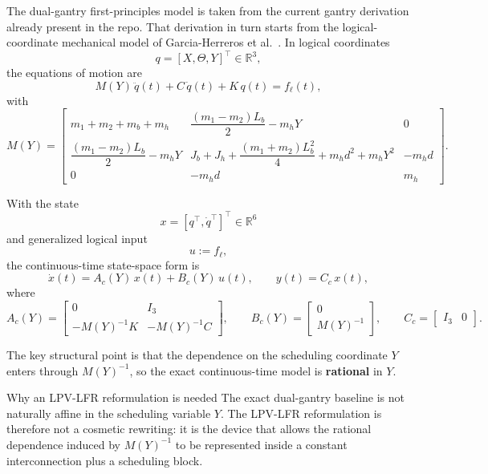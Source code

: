 \documentclass[11pt]{article}
\newcommand{\R}{\mathbb{R}}
\begin{document}
The dual-gantry first-principles model is taken from the current gantry
derivation already present in the repo. That derivation in turn starts from the
logical-coordinate mechanical model of Garcia-Herreros et al.~\cite{garcia2013model}. In logical
coordinates
\[
q = [X,\Theta,Y]^\top \in \R^3,
\]
the equations of motion are
\begin{equation}
    M(Y)\,\ddot{q}(t) + C\,\dot{q}(t) + K\,q(t) = f_\ell(t),
    \label{eqv:eom}
\end{equation}
with
\begin{equation}
    M(Y) =
    \begin{bmatrix}
        m_1 + m_2 + m_b + m_h &
        \dfrac{(m_1-m_2)L_b}{2} - m_h Y &
        0 \\
        \dfrac{(m_1-m_2)L_b}{2} - m_h Y &
        J_b + J_h + \dfrac{(m_1+m_2)L_b^2}{4} + m_h d^2 + m_h Y^2 &
        -m_h d \\
        0 & -m_h d & m_h
    \end{bmatrix}.
    \label{eqv:M}
\end{equation}

With the state
\[
x = [q^\top,\dot{q}^\top]^\top \in \R^6
\]
and generalized logical input
\[
u := f_\ell,
\]
the continuous-time state-space form is
\begin{equation}
    \dot{x}(t) = A_c(Y)\,x(t) + B_c(Y)\,u(t),
    \qquad
    y(t) = C_c\,x(t),
    \label{eqv:ctss}
\end{equation}
where
\begin{equation}
    A_c(Y) =
    \begin{bmatrix}
        0 & I_3 \\
        -M(Y)^{-1}K & -M(Y)^{-1}C
    \end{bmatrix},
    \qquad
    B_c(Y) =
    \begin{bmatrix}
        0 \\
        M(Y)^{-1}
    \end{bmatrix},
    \qquad
    C_c = \begin{bmatrix} I_3 & 0 \end{bmatrix}.
    \label{eqv:ctmats}
\end{equation}

The key structural point is that the dependence on the scheduling coordinate
$Y$ enters through $M(Y)^{-1}$, so the exact continuous-time model is
\textbf{rational} in $Y$.

\begin{resultbox}{Why an LPV-LFR reformulation is needed}
The exact dual-gantry baseline is not naturally affine in the scheduling
variable $Y$. The LPV-LFR reformulation is therefore not a cosmetic rewriting:
it is the device that allows the rational dependence induced by
$M(Y)^{-1}$ to be represented inside a constant interconnection plus a
scheduling block.
\end{resultbox}
\end{document}
